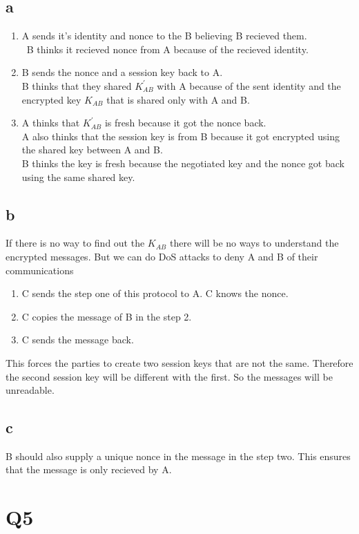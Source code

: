 \documentclass[a4paper, 11pt]{article}
\begin{document}
\subsection{a}
\begin{enumerate}
    \item A sends it's identity and nonce to the B believing B recieved them. \\\
        B thinks it recieved nonce from A because of the recieved identity.
    \item B sends the nonce and a session key back to A. \\
        B thinks that they shared $K^\prime_{AB}$ with A because of the sent
        identity and the encrypted key $K_{AB}$ that is shared only with A
        and B.
    \item A thinks that $K^\prime_{AB}$ is fresh because it got the nonce back. \\
        A also thinks that the session key is from B because it got encrypted
        using the shared key between A and B. \\
        B thinks the key is fresh because the negotiated key and the nonce got
        back using the same shared key.
\end{enumerate}
\subsection{b}
If there is no way to find out the $K_{AB}$ there will be no ways to
understand the encrypted messages. But we can do DoS attacks to deny A and B of
their communications
\begin{enumerate}
    \item C sends the step one of this protocol to A. C knows the nonce.
    \item C copies the message of B in the step 2.
    \item C sends the message back.
\end{enumerate}
This forces the parties to create two session keys that are not the same.
Therefore the second session key will be different with the first.
So the messages will be unreadable.
\subsection{c}
B should also supply a unique nonce in the message in the step two.
This ensures that the message is only recieved by A.
\section{Q5}
\end{document}
